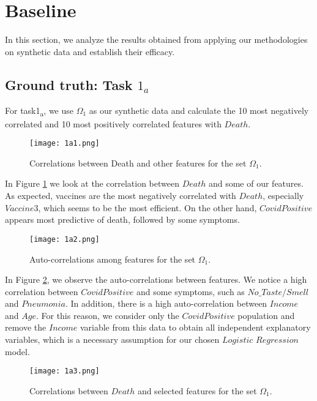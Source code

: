 \section{Baseline}
\label{sec:Baseline}
In this section, we analyze the results obtained from applying our methodologies on synthetic data and establish their efficacy.

\subsection{Ground truth: Task $1_a$}
\label{sec:Ground truth: Task $1_a$}
\graphicspath{{pictures/task1a/}}
For task1\textsubscript{a}, we use $\Omega_1$ as our synthetic data and calculate the 10 most negatively correlated and 10 most positively correlated features with $Death$.

\begin{figure}[H]
  \texttt{[image: 1a1.png]}
  \caption{Correlations between Death and other features for the set $\Omega_1$.}
    \label{fig:1a1}
\end{figure}
In Figure \ref{fig:1a1} we look at the correlation between $Death$ and some of our features. As expected, vaccines are the most negatively correlated with $Death$, especially $Vaccine3$, which seems to be the most efficient. On the other hand, $CovidPositive$ appears most predictive of death, followed by some symptoms. 

\begin{figure}[H]
  \texttt{[image: 1a2.png]}
  \caption{Auto-correlations among features for the set $\Omega_1$.}
  \label{fig:1a2}
\end{figure}

In Figure \ref{fig:1a2}, we observe the auto-correlations between features. We notice a high correlation between $CovidPositive$ and some symptoms, such as $No\_Taste/Smell$ and $Pneumonia$. In addition, there is a high auto-correlation between $Income$ and $Age$. For this reason, we consider only the $CovidPositive$ population and remove the $Income$ variable from this data to obtain all independent explanatory variables, which is a necessary assumption for our chosen $Logistic$ $Regression$ model. 

\begin{figure}[H]
  \texttt{[image: 1a3.png]}
  \caption{Correlations between $Death$ and selected features for the set $\Omega_1$.}
  \label{fig:1a3}
\end{figure}

